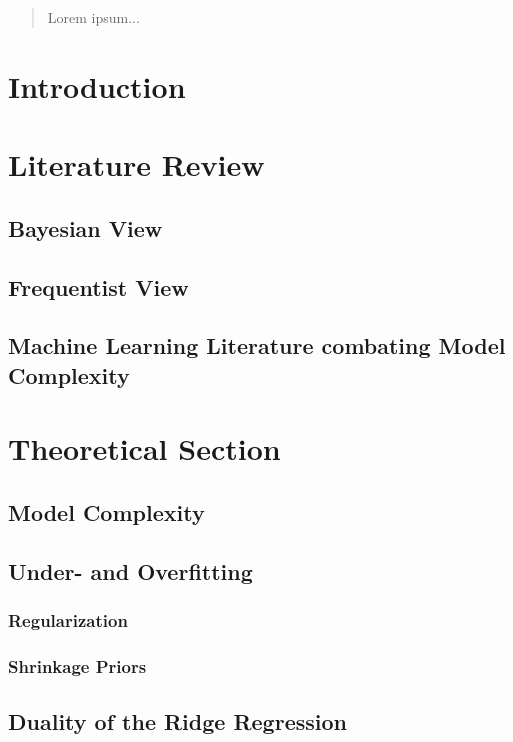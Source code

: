 \documentclass[12pt,a4paper]{article}
\begin{document}
\begin{abstract}
Lorem ipsum...
\end{abstract}

\clearpage
\thispagestyle{plain}
\tableofcontents
\pagebreak
{}

\pagebreak
\section{Introduction}

\section{Literature Review}
\subsection{Bayesian View}
\subsection{Frequentist View}
\subsection{Machine Learning Literature combating Model Complexity}

\section{Theoretical Section}
\subsection{Model Complexity}
\subsection{Under- and Overfitting}
\subsubsection{Regularization}
\subsubsection{Shrinkage Priors}
\subsection{Duality of the Ridge Regression}
\end{document}
